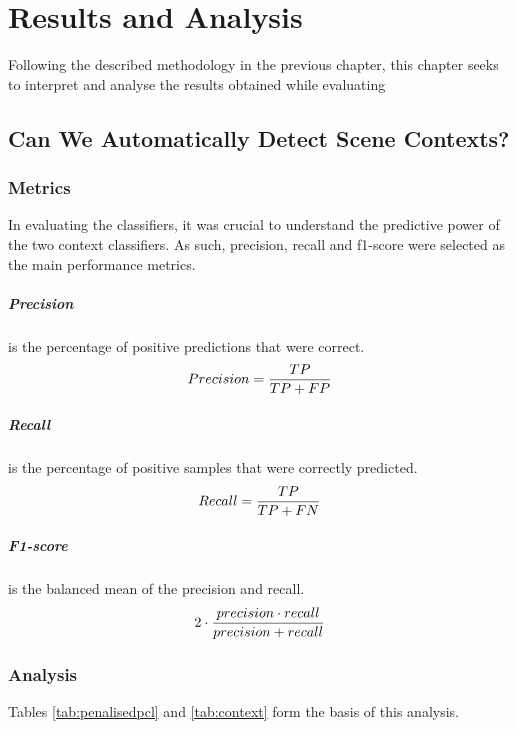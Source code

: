 
\let\textcircled=\pgftextcircled

\chapter{Results and Analysis}
\label{chap:results}

Following the described methodology in the previous chapter, this chapter seeks to interpret and analyse the results obtained while evaluating 


\section{Can We Automatically Detect Scene Contexts?}
\subsection{Metrics}
In evaluating the classifiers, it was  crucial to understand the predictive power of the two context classifiers. As such, precision, recall and f1-score were selected as the main performance metrics. 
\paragraph{Precision} is the percentage of positive predictions that were correct. 
\begin{equation*}
\centering
Precision=\frac{TP}{TP+FP}
\end{equation*}
\paragraph{Recall} is the percentage of positive samples that were correctly predicted. 
\begin{equation*}
\centering
Recall=\frac{TP}{TP+FN}
\end{equation*}
\paragraph{F1-score} is the balanced mean of the precision and recall.  
\begin{equation*}
\centering 
2\cdot\frac{precision\cdot recall}{precision+recall}
\end{equation*}
\subsection{Analysis}
Tables \ref{tab:penalisedpcl} and \ref{tab:context} form the basis of this analysis.

